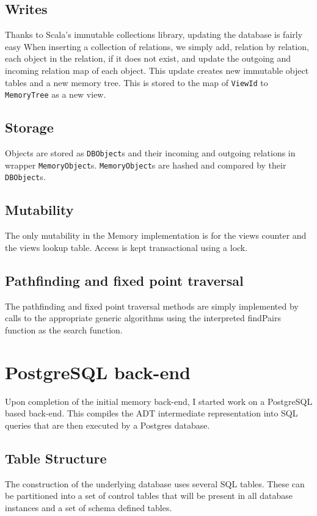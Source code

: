 \documentclass[12pt,a4paper,twoside,openright]{report}
\newcommand\codeName[1]{\texttt{#1}}
\begin{document}
	\subsection{Writes}
	Thanks to Scala's immutable collections library, updating the database is fairly easy When inserting a collection of relations, we simply add, relation by relation, each object in the relation, if it does not exist, and update the outgoing and incoming relation map of each object. This update creates new immutable object tables and a new memory tree. This is stored to the map of \codeName{ViewId}  to \codeName{MemoryTree} as a new view.

	\subsection{Storage}
	Objects are stored as \codeName{DBObject}s and their incoming and outgoing relations in wrapper \codeName{MemoryObject}s. \codeName{MemoryObject}s  are hashed and compared by their \codeName{DBObject}s.
	
	\subsection{Mutability}
	The only mutability in the Memory implementation is for the views counter and the views lookup table. Access is kept transactional using a lock.

	\subsection{Pathfinding and fixed point traversal}
	The pathfinding and fixed point traversal methods are simply implemented by calls to the appropriate generic algorithms using the interpreted findPairs function as the search function.


\section{PostgreSQL back-end}
Upon completion of the initial memory back-end, I started work on a PostgreSQL based back-end. This compiles the ADT intermediate representation into SQL queries that are then executed by a Postgres database.

	\subsection{Table Structure}
	The construction of the underlying database uses several SQL tables. These can be partitioned into a set of control tables that will be present in all database instances and a set  of schema defined tables.
\end{document}
